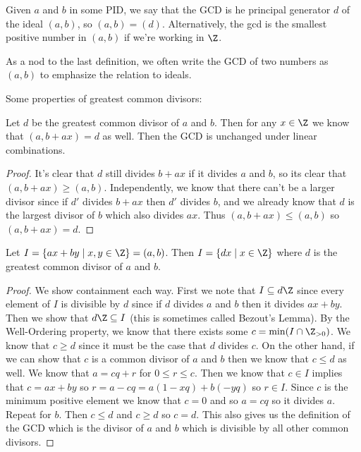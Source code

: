 \begin{definition}[GCD]
Given $a$ and $b$ in some PID, we say that the GCD is he principal generator $d$ of the ideal $(a,b)$, so $(a,b) = (d)$. Alternatively, the gcd is the smallest positive number in $(a,b)$ if we're working in $\Z$.
\end{definition}

\begin{notation}[GCD]
As a nod to the last definition, we often write the GCD of two numbers as $(a,b)$ to emphasize the relation to ideals.
\end{notation}

Some properties of greatest common divisors:

\begin{lemma}
Let $d$ be the greatest common divisor of $a$ and $b$. Then for any $x \in \Z$ we know that $(a, b+ax) = d$ as well. Then the GCD is unchanged under linear combinations.
\end{lemma}

\begin{proof}
It's clear that $d$ still divides $b+ax$ if it divides $a$ and $b$, so its clear that $(a,b+ax) \geq (a,b)$. Independently, we know that there can't be a larger divisor since if $d'$ divides $b + ax$ then $d'$ divides $b$, and we already know that $d$ is the largest divisor of $b$ which also divides $ax$. Thus $(a,b+ax) \leq (a,b)$ so $(a,b+ax) = d$.
\end{proof}

\begin{lemma}
Let $I = \{ax+by \mid x,y \in \Z\} = (a,b)$. Then $I = \{dx \mid x \in \Z\}$ where $d$ is the greatest common divisor of $a$ and $b$.
\end{lemma}

\begin{proof}
We show containment each way. First we note that $I \subseteq d\Z$ since every element of $I$ is divisible by $d$ since if $d$ divides $a$ and $b$ then it divides $ax+by$. Then we show that $d\Z \subseteq I$ (this is sometimes called Bezout's Lemma).  By the Well-Ordering property, we know that there exists some $c = \min(I \cap \Z_{>0})$. We know that $c \geq d$ since it must be the case that $d$ divides $c$. On the other hand, if we can show that $c$ is a common divisor of $a$ and $b$ then we know that $c \leq d$ as well. We know that $a = cq + r$ for $0 \leq r \leq c$. Then we know that $c \in I$ implies that $c = ax + by$ so $r = a-cq = a(1-xq) + b(-yq)$ so $r \in I$. Since $c$ is the minimum positive element we know that $c = 0$ and so $a = cq$ so it divides $a$. Repeat for $b$. Then $c \leq d$ and $c \geq d$ so $c=d$. This also gives us the definition of the GCD which is the divisor of $a$ and $b$ which is divisible by all other common divisors.
\end{proof}

